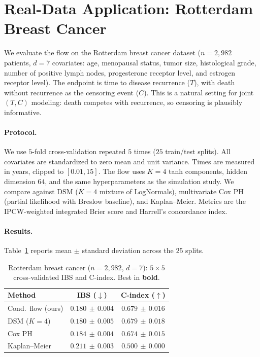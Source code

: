 \section{Real-Data Application: Rotterdam Breast Cancer}
\label{sec:real}

We evaluate the flow on the Rotterdam breast cancer dataset
\citep{foekens2000rotterdam} ($n = 2{,}982$ patients, $d = 7$ covariates:
age, menopausal status, tumor size, histological grade, number of positive
lymph nodes, progesterone receptor level, and estrogen receptor level).
The endpoint is time to disease recurrence ($T$), with death without
recurrence as the censoring event ($C$). This is a natural setting for
joint $(T, C)$ modeling: death competes with recurrence, so censoring is
plausibly informative.

\paragraph{Protocol.}
We use $5$-fold cross-validation repeated $5$ times ($25$ train/test
splits). All covariates are standardized to zero mean and unit variance.
Times are measured in years, clipped to $[0.01, 15]$. The flow uses
$K = 4$ tanh components, hidden dimension $64$, and the same
hyperparameters as the simulation study. We compare against DSM ($K{=}4$
mixture of LogNormals), multivariate Cox PH (partial likelihood with
Breslow baseline), and Kaplan--Meier. Metrics are the IPCW-weighted
integrated Brier score \citep{graf1999assessment} and Harrell's
concordance index.

\paragraph{Results.}
Table~\ref{tab:rotterdam} reports mean $\pm$ standard deviation across
the $25$ splits.

\begin{table}[t]
\caption{Rotterdam breast cancer ($n = 2{,}982$, $d = 7$): $5 \times 5$
cross-validated IBS and C-index. Best in \textbf{bold}.}
\label{tab:rotterdam}
\centering
\small
\begin{tabular}{lcc}
\toprule
Method & IBS ($\downarrow$) & C-index ($\uparrow$) \\
\midrule
Cond.\ flow (ours) & $\mathbf{0.180\,{\pm}\,0.004}$ & $\mathbf{0.679\,{\pm}\,0.016}$ \\
DSM ($K{=}4$)       & $\mathbf{0.180\,{\pm}\,0.005}$ & $0.679\,{\pm}\,0.018$ \\
Cox PH              & $0.184\,{\pm}\,0.004$ & $0.674\,{\pm}\,0.015$ \\
Kaplan--Meier       & $0.211\,{\pm}\,0.003$ & $0.500\,{\pm}\,0.000$ \\
\bottomrule
\end{tabular}
\end{table}

